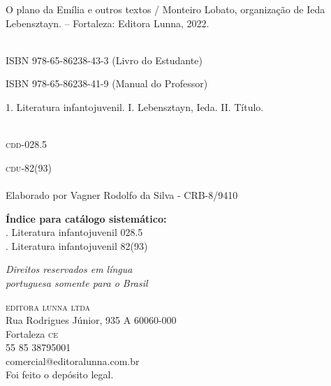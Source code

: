 \hspace{20pt}\parbox{190pt}{O plano da Emília e outros textos / Monteiro Lobato, organização de Ieda Lebensztayn. -- Fortaleza: Editora Lunna, 2022.}\\[6pt]

\hspace{20pt}ISBN 978-65-86238-43-3  (Livro do Estudante)

\hspace{20pt}ISBN 978-65-86238-41-9  (Manual do Professor)\\[6pt]

\hspace{20pt}\parbox{190pt}{1. Literatura infantojuvenil. I. Lebensztayn, Ieda. II. Título.}\\[6pt]

\hspace{188pt}\textsc{cdd}-028.5

\hspace{188pt}\textsc{cdu}-82(93)\\

\hrulefill\\
\noindent{}Elaborado por Vagner Rodolfo da Silva - CRB-8/9410

\qquad \textbf{Índice para catálogo sistemático:}\\
\mbox{}. Literatura infantojuvenil 028.5\\
\mbox{}. Literatura infantojuvenil 82(93)

\vfill

\textit{Direitos reservados em língua\\ 
portuguesa somente para o Brasil}\\\smallskip

\textsc{editora lunna ltda}\\
Rua Rodrigues Júnior, 935 A \bullet{} 60060-000\\
Fortaleza \textsc{ce}\\
55 85 38795001\\
comercial@editoralunna.com.br\\

Foi feito o depósito legal.
\endgroup
\pagebreak